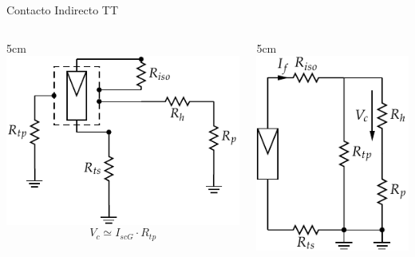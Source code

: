 \documentclass[xcolor={usenames,svgnames,dvipsnames}]{beamer}
\begin{document}
\begin{frame}[label=sec-2-3-1]{Contacto Indirecto TT}
\begin{columns}
\begin{column}{5cm\textwidth}
\includegraphics[width=\textwidth]{../figs/ContactoIndirectoTT.pdf}
$$V_{c}\simeq I_{scG}\cdot R_{tp}$$
\end{column}

\begin{column}{5cm\textwidth}
\includegraphics[width=\textwidth]{../figs/ContactoIndirectoTT_simple.pdf}
\end{column}
\end{columns}
\end{frame}
\end{document}
